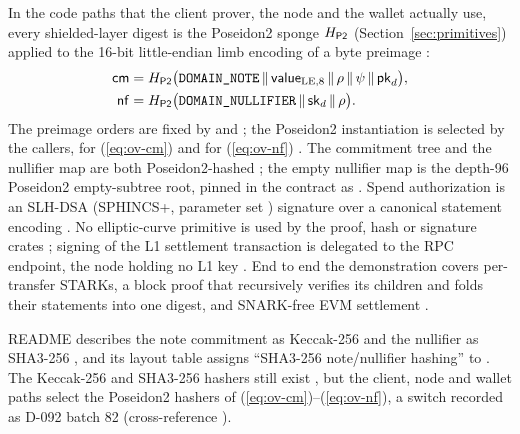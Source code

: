 In the code paths that the client prover, the node and the wallet actually
use, every shielded-layer digest is the Poseidon2 sponge $H_{\mathsf{P2}}$ (Section~\ref{sec:primitives})
applied to the 16-bit little-endian limb encoding of a byte preimage
:
\begin{align}
  \mathsf{cm} &= H_{\mathsf{P2}}\bigl(\texttt{DOMAIN\_NOTE} \,\|\, \mathsf{value}_{\mathrm{LE},8} \,\|\, \rho \,\|\, \psi \,\|\, \mathsf{pk}_d\bigr),
  \label{eq:ov-cm}\\
  \mathsf{nf} &= H_{\mathsf{P2}}\bigl(\texttt{DOMAIN\_NULLIFIER} \,\|\, \mathsf{sk}_d \,\|\, \rho\bigr).
  \label{eq:ov-nf}
\end{align}
The preimage orders are fixed by  and 
; the Poseidon2 instantiation is
selected by the callers,  for (\ref{eq:ov-cm}) and
 for (\ref{eq:ov-nf})
.
The commitment tree and the nullifier map are both Poseidon2-hashed
; the empty nullifier map is the
depth-96 Poseidon2 empty-subtree root, pinned in the contract as
 .
Spend authorization is an SLH-DSA (SPHINCS+, parameter set )
signature over a canonical statement encoding
.
No elliptic-curve primitive is used by the proof, hash or signature crates
; signing of the L1 settlement transaction is delegated to
the RPC endpoint, the node holding no L1 key
. End to end the demonstration
covers per-transfer STARKs, a block proof that recursively verifies its
children and folds their statements into one digest, and SNARK-free EVM
settlement .

\begin{specdelta}
README describes the note commitment as Keccak-256 and the nullifier as
SHA3-256 , and its layout table assigns ``SHA3-256
note/nullifier hashing'' to  . The
Keccak-256 and SHA3-256 hashers still exist
,
but the client, node and wallet paths select the Poseidon2 hashers of
(\ref{eq:ov-cm})--(\ref{eq:ov-nf}), a switch recorded as D-092 batch 82
(cross-reference ).
\end{specdelta}

